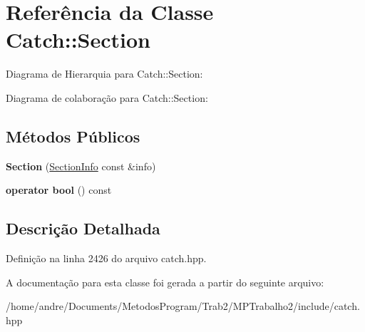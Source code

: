 \hypertarget{classCatch_1_1Section}{}\section{Referência da Classe Catch\+:\+:Section}
\label{classCatch_1_1Section}


Diagrama de Hierarquia para Catch\+:\+:Section\+:


Diagrama de colaboração para Catch\+:\+:Section\+:
\subsection*{Métodos Públicos}
\begin{DoxyCompactItemize}
\item 
{\bfseries Section} (\hyperlink{structCatch_1_1SectionInfo}{Section\+Info} const \&info)\hypertarget{classCatch_1_1Section_a68fd4e51e8981aaa7ddb00d8a6abd099}{}\label{classCatch_1_1Section_a68fd4e51e8981aaa7ddb00d8a6abd099}

\item 
{\bfseries operator bool} () const \hypertarget{classCatch_1_1Section_a6c9be48e8ba0611c4aa601102e706f3b}{}\label{classCatch_1_1Section_a6c9be48e8ba0611c4aa601102e706f3b}

\end{DoxyCompactItemize}


\subsection{Descrição Detalhada}


Definição na linha 2426 do arquivo catch.\+hpp.



A documentação para esta classe foi gerada a partir do seguinte arquivo\+:\begin{DoxyCompactItemize}
\item 
/home/andre/\+Documents/\+Metodos\+Program/\+Trab2/\+M\+P\+Trabalho2/include/catch.\+hpp\end{DoxyCompactItemize}
